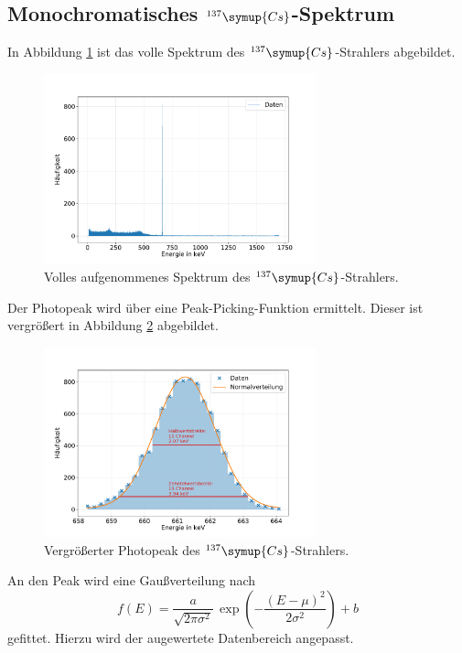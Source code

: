 \subsection{Monochromatisches $^{137}\symup{Cs}$-Spektrum}
In Abbildung \ref{fig:cs_spectrum} ist das volle Spektrum des $^{137}\symup{Cs}$-Strahlers abgebildet.
\begin{figure}[h!]
  \centering
  \includegraphics[width=0.7\textwidth]{content/images/caesium_vollesspektrum.pdf}
  \caption{Volles aufgenommenes Spektrum des $^{137}\symup{Cs}$-Strahlers.}
  \label{fig:cs_spectrum}
\end{figure}
Der Photopeak wird über eine Peak-Picking-Funktion ermittelt.
Dieser ist vergrößert in Abbildung \ref{fig:cs_photopeak} abgebildet.
\begin{figure}[h!]
  \centering
  \includegraphics[width=0.7\textwidth]{content/images/caesium_peak_1.pdf}
  \caption{Vergrößerter Photopeak des $^{137}\symup{Cs}$-Strahlers.}
  \label{fig:cs_photopeak}
\end{figure}
An den Peak wird eine Gaußverteilung nach
\begin{equation*}
	f(E) = \frac{a}{\sqrt{2 \pi \sigma^2}} \, \exp{\left( - \frac{(E-\mu)^2}{2 \sigma^2} \right)} + b
\end{equation*}
gefittet.
Hierzu wird der augewertete Datenbereich angepasst.
